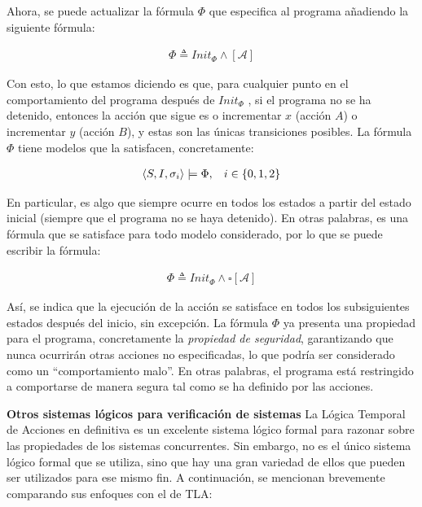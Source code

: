 Ahora, se puede actualizar la fórmula $\Phi$ que especifica al programa añadiendo la siguiente fórmula:

\begin{align*}
    \Phi \triangleq Init_{\Phi} \land [\mathcal{A}]
\end{align*}

Con esto, lo que estamos diciendo es que, para cualquier punto en el comportamiento del programa después de $Init_{\Phi}$ , si el programa no se ha detenido, entonces la acción que sigue es o incrementar $x$ (acción $A$) o incrementar $y$ (acción $B$), y estas son las únicas transiciones posibles. La fórmula $\Phi$ tiene modelos que la satisfacen, concretamente:

\begin{align*}
    \langle S, I, \sigma_i \rangle \models \Phi, \hspace{0.3cm} i \in \lbrace 0,1,2 \rbrace
\end{align*}

En particular, es algo que siempre ocurre en todos los estados a partir del estado inicial (siempre que el programa no se haya detenido). En otras palabras, es una fórmula que se satisface para todo modelo considerado, por lo que se puede escribir la fórmula:

\begin{align*}
    \Phi \triangleq Init_{\Phi} \land \square[\mathcal{A}]
\end{align*}

Así, se indica que la ejecución de la acción se satisface en todos los subsiguientes estados después del inicio, sin excepción. La fórmula $\Phi$ ya presenta una propiedad para el programa, concretamente la \textit{propiedad de seguridad}, garantizando que nunca ocurrirán otras acciones no especificadas, lo que podría ser considerado como un ``comportamiento malo''. En otras palabras, el programa está restringido a comportarse de manera segura tal como se ha definido por las acciones.

\textbf{Otros sistemas lógicos para verificación de sistemas}\label{section:otherlogics}
La Lógica Temporal de Acciones en definitiva es un excelente sistema lógico formal para razonar sobre las propiedades de los sistemas concurrentes. Sin embargo, no es el único sistema lógico formal que se utiliza, sino que hay una gran variedad de ellos que pueden ser utilizados para ese mismo fin. A continuación, se mencionan brevemente comparando sus enfoques con el de TLA:

